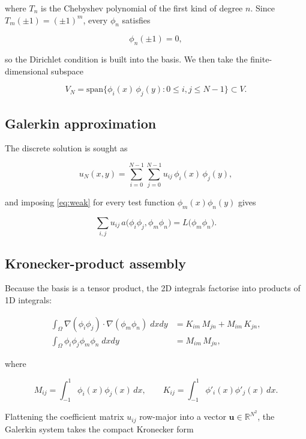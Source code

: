 \documentclass[11pt,a4paper,twoside,pdf]{article}
\numberwithin{equation}{section}
\begin{document}
where $T_{n}$ is the Chebyshev polynomial of the first kind of degree
$n$. Since $T_{m}(\pm 1) = (\pm 1)^{m}$, every $\phi_{n}$ satisfies

\[
\phi_{n}(\pm 1) = 0,
\]

so the Dirichlet condition is built into the basis.  We then take the
finite-dimensional subspace

\[
V_{N} = \mathrm{span}\bigl\{\phi_{i}(x)\,\phi_{j}(y)
: 0 \leq i, j \leq N-1 \bigr\} \subset V.
\]

\subsection{Galerkin approximation}

The discrete solution is sought as

\begin{equation}
u_{N}(x,y) = \sum_{i=0}^{N-1}\sum_{j=0}^{N-1}
u_{ij}\, \phi_{i}(x)\,\phi_{j}(y),
\end{equation}

and imposing \eqref{eq:weak} for every test function
$\phi_{m}(x)\phi_{n}(y)$ gives

\begin{equation}
\sum_{i,j} u_{ij}\,
a\bigl(\phi_{i}\phi_{j}, \phi_{m}\phi_{n}\bigr)
= L\bigl(\phi_{m}\phi_{n}\bigr).
\end{equation}

\subsection{Kronecker-product assembly}

Because the basis is a tensor product, the 2D integrals factorise
into products of 1D integrals:

\begin{align*}
\int_{\Omega} \nabla(\phi_{i}\phi_{j})\cdot\nabla(\phi_{m}\phi_{n}) \; dxdy
&= K_{im}\, M_{jn} + M_{im}\, K_{jn}, \\
\int_{\Omega} \phi_{i}\phi_{j}\phi_{m}\phi_{n} \; dxdy
&= M_{im}\, M_{jn},
\end{align*}

where

\begin{equation}
M_{ij} = \int_{-1}^{1} \phi_{i}(x)\phi_{j}(x)\, dx,
\qquad
K_{ij} = \int_{-1}^{1} \phi'_{i}(x)\phi'_{j}(x)\, dx.
\end{equation}

Flattening the coefficient matrix $u_{ij}$ row-major into a vector
$\mathbf{u} \in \mathbb{R}^{N^{2}}$, the Galerkin system takes the
compact Kronecker form
\end{document}
